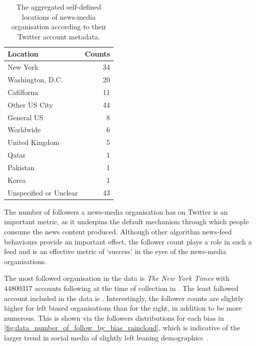 \begin{table}
	\centering
	\begin{tabular}{lr}
		\toprule
		Location &  Counts \\
		\midrule
		New York &      34 \\
		Washington, D.C. &      20 \\
		Cafilforna &      11 \\
		Other US City &      44 \\
		General US &       8 \\
		Worldwide &       6 \\
		United Kingdom &       5 \\
		Qatar &       1 \\
		Pakistan &       1 \\
		Korea  &       1 \\
		Unspecified or Unclear &      43 \\
		\bottomrule
	\end{tabular}
	\caption{The aggregated self-defined locations of news-media organisation according to their Twitter account metadata. }
	\label{tab:data_locations}
\end{table}


The number of followers a news-media organisation has on Twitter is an important metric, as it underpins the default mechanism through which people consume the news content produced. Although other algorithm news-feed  behaviours provide an important effect, the follower count plays a role in such a feed and is an effective metric of `success' in the eyes of the news-media organisations.

The most followed organisation in the data is \emph{The New York Times} with 44800317 accounts following at the time of collection in . The least followed account included in the data is . Interestingly, the follower counts are slightly higher for left biased organisations than for the right, in addition to be more numerous. This is shown via the followers distributions for each bias in \autoref{fig:data_number_of_follow_by_bias_raincloud}, which is indicative of the larger trend in social media of slightly left leaning demographics~\cite{mellon_twitter_2017}.

